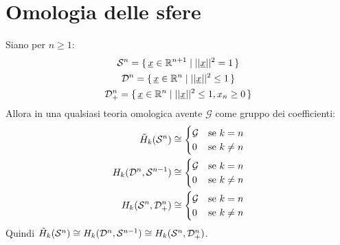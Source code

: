 \section{Omologia delle sfere}
\begin{theorem}
  Siano per $ n \geq 1$:
  \begin{gather*}
    \mathcal{S}^{n} = \set{\underline{x} \in \mathbb{R}^{n+1} | ||\underline{x}||^2 = 1} \\
    \mathcal{D}^{n} = \set{\underline{x} \in \mathbb{R}^{n} | ||\underline{x}||^2 \leq 1} \\
    \mathcal{D}^{n}_+ = \set{\underline{x} \in \mathbb{R}^{n} | ||\underline{x}||^2 \leq 1, x_n \geq 0}
  \end{gather*}
  Allora in una qualsiasi teoria omologica avente $ \mathcal{G} $ come
  gruppo dei coefficienti:
  \begin{align*}
    \tilde{H}_k(\mathcal{S}^{n}) & \cong
    \begin{cases}
      \mathcal{G} & \text{se } k = n \\
      0 & \text{se } k \not = n
    \end{cases} \\
    H_k(\mathcal{D}^{n}, \mathcal{S}^{n-1}) & \cong
    \begin{cases}
      \mathcal{G} & \text{se } k = n \\
      0 & \text{se } k \not = n
    \end{cases} \\
    H_k(\mathcal{S}^{n}, \mathcal{D}^{n}_+) & \cong
    \begin{cases}
      \mathcal{G} & \text{se } k = n \\
      0 & \text{se } k \not = n
    \end{cases}
  \end{align*}
  Quindi $ \tilde{H}_k(\mathcal{S}^{n}) \cong H_k(\mathcal{D}^{n}, \mathcal{S}^{n-1}) \cong H_k(\mathcal{S}^{n}, \mathcal{D}^{n}_+) $.
\end{theorem}
